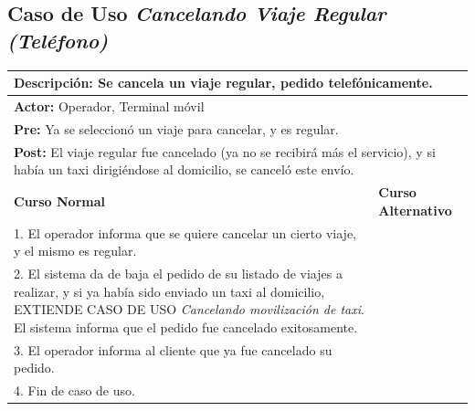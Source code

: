 \documentclass[a4paper]{article}
\begin{document}
\subsection{Caso de Uso \textit{Cancelando Viaje Regular (Tel\'efono)}}
\begin{center}
\begin{tabular}{|p{10cm} | p{6cm}|}
\hline
\multicolumn{2}{|p{16cm}|}{\textbf{Descripci\'on:} Se cancela un viaje regular, pedido telef\'onicamente. } \\
\hline
\multicolumn{2}{|l|}{\textbf{Actor:} Operador, Terminal m\'ovil} \\
\hline
\multicolumn{2}{|l|}{\textbf{Pre:} Ya se seleccion\'o un viaje para cancelar, y es regular. } \\
\hline
\multicolumn{2}{|p{16cm}|}{\textbf{Post:} El viaje regular fue cancelado (ya no se recibir\'a m\'as el servicio), y si hab\'ia un taxi dirigi\'endose al domicilio, se cancel\'o este env\'io.}\\
\hline
\textbf{Curso Normal}  & \textbf{Curso Alternativo} \\ \hline
1. El operador informa que se quiere cancelar un cierto viaje, y el mismo es regular. & \\ \hline
2. El sistema da de baja el pedido de su listado de viajes a realizar, y si ya hab\'ia sido enviado un taxi al domicilio, EXTIENDE CASO DE USO \textit{Cancelando movilizaci\'on de taxi}. El sistema informa que el pedido fue cancelado exitosamente. & \\ \hline
3. El operador informa al cliente que ya fue cancelado su pedido. & \\ \hline
4. Fin de caso de uso. & \\ \hline
\end{tabular}
\end{center}
\end{document}
